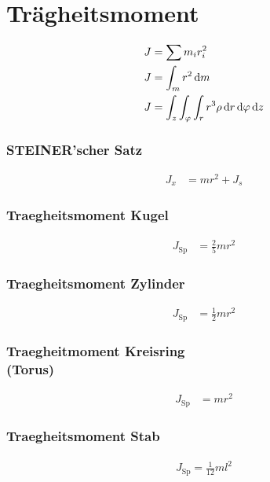 \newpage
\section{Trägheitsmoment}


\begin{align*}
J&=\sum m_i r_i^2\\
J&=\int_m r^2 \mathop{}\!\mathrm{d} m \\
J&=\int_z\int_\varphi\int_r r^3\rho \mathop{}\!\mathrm{d} r \mathop{}\!\mathrm{d} \varphi \mathop{}\!\mathrm{d} z 
\end{align*}

\begin{multicols}{2}{}
\subsubsection*{STEINER'scher Satz}
\begin{align*}
J_x&=mr^2+J_s
\end{align*}

\subsubsection*{Traegheitsmoment Kugel}
\begin{align*}
J_\text{Sp}&=\frac{2}{5}mr^2
\end{align*}


\subsubsection*{Traegheitsmoment Zylinder}
\begin{align*}
J_\text{Sp}&=\frac{1}{2}mr^2
\end{align*}


\subsubsection*{Traegheitmoment Kreisring \\(Torus)}
\begin{align*}
J_\text{Sp}&=mr^2
\end{align*}


\subsubsection*{Traegheitsmoment Stab}
\begin{align*}
J_\text{Sp}=\frac{1}{12}ml^2
\end{align*}
\end{multicols}


